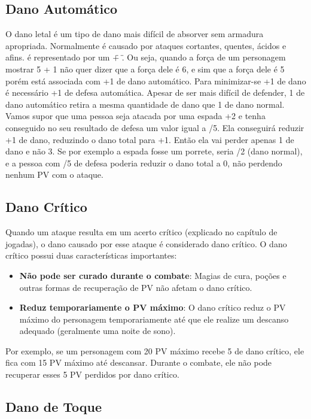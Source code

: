 \subsection{Dano Automático}

O dano letal é um tipo de dano mais difícil de absorver sem armadura apropriada. Normalmente é causado por ataques cortantes, quentes, ácidos e afins. é representado por um \" + \". Ou seja, quando a força de um personagem mostrar 5 + 1 não quer dizer que a força dele é 6, e sim que a força dele é 5 porém está associada com +1 de dano automático. Para minimizar-se +1 de dano é necessário +1 de defesa automática. Apesar de ser mais difícil de defender, 1 de dano automático retira a mesma quantidade de dano que 1 de dano normal. 
Vamos supor que uma pessoa seja atacada por uma espada +2 e tenha conseguido no seu resultado de defesa um valor igual a /5. Ela conseguirá reduzir +1 de dano, reduzindo o dano total para +1. Então ela vai perder apenas 1 de dano e não 3. Se por exemplo a espada fosse um porrete, seria /2 (dano normal), e a pessoa com /5 de defesa poderia reduzir o dano total a 0, não perdendo nenhum PV com o ataque.

\subsection{Dano Crítico}

Quando um ataque resulta em um acerto crítico (explicado no capítulo de jogadas), o dano causado por esse ataque é considerado dano crítico. O dano crítico possui duas características importantes:

\begin{itemize}
	\item \textbf{Não pode ser curado durante o combate}: Magias de cura, poções e outras formas de recuperação de PV não afetam o dano crítico.
	\item \textbf{Reduz temporariamente o PV máximo}: O dano crítico reduz o PV máximo do personagem temporariamente até que ele realize um descanso adequado (geralmente uma noite de sono).
\end{itemize}

Por exemplo, se um personagem com 20 PV máximo recebe 5 de dano crítico, ele fica com 15 PV máximo até descansar. Durante o combate, ele não pode recuperar esses 5 PV perdidos por dano crítico.

\subsection{Dano de Toque}


